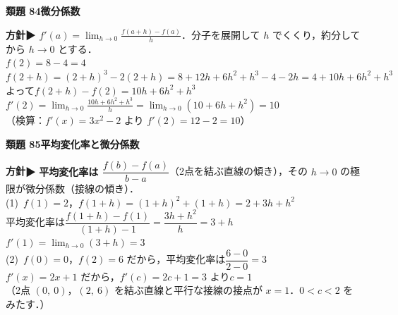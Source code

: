 \documentclass[a4paper,11pt]{ltjsarticle}
\newcommand{\ans}[2]{\Needspace{5\baselineskip}\vspace{6pt}%
  {\sffamily\bfseries 類題 #1\quad #2}\par}
\newcommand{\point}[1]{\textsf{\bfseries ▶ #1}}
\newcommand{\ax}[4]{\draw[->] (#1,0)--(#2,0) node[right]{\scriptsize $x$};
  \draw[->] (0,#3)--(0,#4) node[above]{\scriptsize $y$};
  \node[below left] at (0,0){\scriptsize O};}
\begin{document}
\ans{84}{微分係数}
\begin{kai}
\textbf{方針}\quad \point{$f'(a)=\displaystyle\lim_{h\to0}\frac{f(a+h)-f(a)}{h}$}．分子を展開して $h$ でくくり，約分してから $h\to0$ とする．\\[2pt]
$f(2)=8-4=4$\\
$f(2+h)=(2+h)^3-2(2+h)=8+12h+6h^2+h^3-4-2h=4+10h+6h^2+h^3$\\
よって\quad $f(2+h)-f(2)=10h+6h^2+h^3$\\[2pt]
$f'(2)=\displaystyle\lim_{h\to0}\frac{10h+6h^2+h^3}{h}=\lim_{h\to0}(10+6h+h^2)=10$\\
（検算：$f'(x)=3x^2-2$ より $f'(2)=12-2=10$）
\end{kai}

\ans{85}{平均変化率と微分係数}
\begin{kai}
\textbf{方針}\quad \point{平均変化率は $\dfrac{f(b)-f(a)}{b-a}$}（2点を結ぶ直線の傾き），その $h\to0$ の極限が微分係数（接線の傾き）．\\[2pt]
(1)\ $f(1)=2$，\quad $f(1+h)=(1+h)^2+(1+h)=2+3h+h^2$\\
\hspace*{1.5em}平均変化率は\quad $\dfrac{f(1+h)-f(1)}{(1+h)-1}=\dfrac{3h+h^2}{h}=3+h$\\
\hspace*{1.5em}$f'(1)=\displaystyle\lim_{h\to0}(3+h)=3$\\[2pt]
(2)\ $f(0)=0$，$f(2)=6$ だから，平均変化率は\quad $\dfrac{6-0}{2-0}=3$\\
\hspace*{1.5em}$f'(x)=2x+1$ だから，$f'(c)=2c+1=3$ より\quad $c=1$\\
\hspace*{1.5em}（2点 $(0,\ 0)$，$(2,\ 6)$ を結ぶ直線と平行な接線の接点が $x=1$．$0<c<2$ をみたす．）
\begin{center}
\end{center}
\end{kai}
\end{document}
